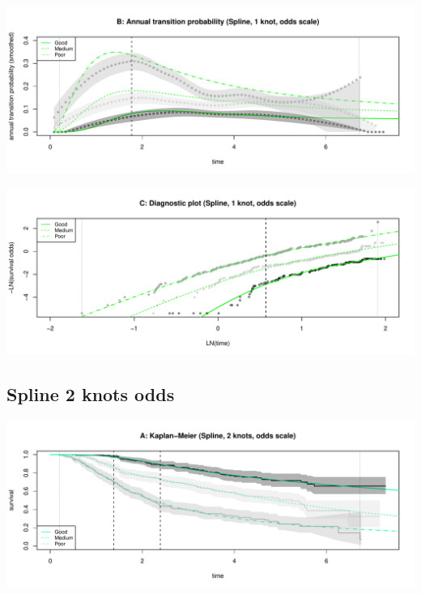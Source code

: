 \documentclass[
]{article}
\begin{document}
\begin{flushleft}\includegraphics[height=0.25\textheight]{Images/spline_odds1-2} \end{flushleft}

\begin{flushleft}\includegraphics[height=0.25\textheight]{Images/spline_odds1-3} \end{flushleft}

\clearpage

\hypertarget{spline-2-knots-odds}{%
\subsection{Spline 2 knots odds}\label{spline-2-knots-odds}}

\begin{flushleft}\includegraphics[height=0.25\textheight]{Images/spline_odds2-1} \end{flushleft}
\end{document}
